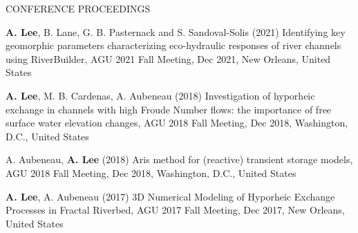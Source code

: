 \documentclass{resume_anzy} %
\begin{document}
%



\begin{rSection}{CONFERENCE PROCEEDINGS}
\vspace{-2.5mm}
\item \textbf{A. Lee}, B. Lane, G. B. Pasternack and S. Sandoval-Solis (2021) Identifying key geomorphic parameters characterizing eco-hydraulic responses of river channels using RiverBuilder, AGU 2021 Fall Meeting, Dec 2021, New Orleans, United States 
\item \textbf{A. Lee}, M. B. Cardenas, A. Aubeneau (2018) Investigation of hyporheic exchange in channels with high Froude Number flows: the importance of free surface water elevation changes, AGU 2018 Fall Meeting, Dec 2018, Washington, D.C., United States 
\item A. Aubeneau, \textbf{A. Lee}  (2018) Aris method for (reactive) transient storage models, AGU 2018 Fall Meeting, Dec 2018, Washington, D.C., United States 
\item \textbf{A. Lee}, A. Aubeneau (2017) 3D Numerical Modeling of Hyporheic Exchange Processes in Fractal Riverbed, AGU 2017 Fall Meeting, Dec 2017, New Orleans, United States 
\end{rSection}

\end{document}
